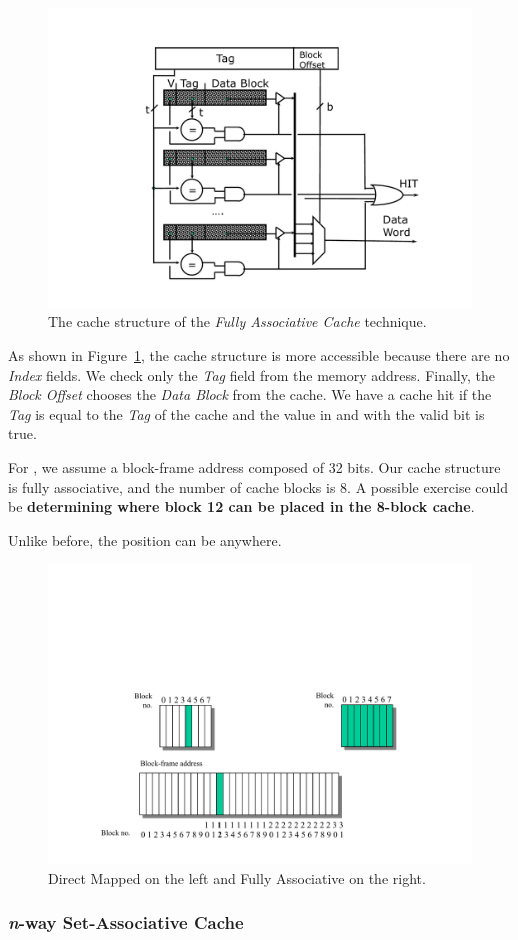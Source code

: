 \begin{figure}[!htp]
    \centering
    \includegraphics[width=.7\textwidth]{img/direct-mapped-cache-5.pdf}
    \caption{The cache structure of the \emph{Fully Associative Cache} technique.}
    \label{fig: cache structure of the Fully Associative Cache}
\end{figure}

\noindent
As shown in Figure~\ref{fig: cache structure of the Fully Associative Cache}, the cache structure is more accessible because there are no \emph{Index} fields. We check only the \emph{Tag} field from the memory address. Finally, the \emph{Block Offset} chooses the \emph{Data Block} from the cache. We have a cache hit if the \emph{Tag} is equal to the \emph{Tag} of the cache and the value in and with the valid bit is true.

\newpage

\noindent
For , we assume a block-frame address composed of 32 bits. Our cache structure is fully associative, and the number of cache blocks is 8. A possible exercise could be \textbf{determining where block 12 can be placed in the 8-block cache}.

\highspace
Unlike before, the position can be anywhere.

\begin{figure}[!htp]
    \centering
    \includegraphics[width=.8\textwidth]{img/direct-mapped-cache-6.pdf}
    \caption*{Direct Mapped on the left and Fully Associative on the right.}
\end{figure}

\newpage

\subsubsection*{\textcolor{Red2}{\emph{n}-way Set-Associative Cache}}\label{n-way Set-Associative Cache}

